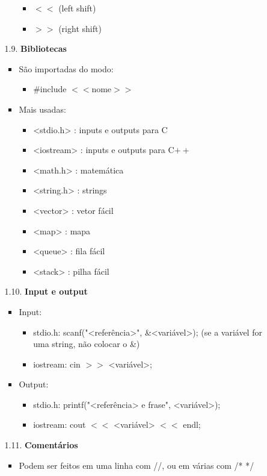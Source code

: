 \documentclass[12pt, a4paper]{article} %
\begin{document}
\begin{enumerate}
\begin{enumerate}
\begin{itemize}
\begin{itemize}
\item $<<$ (left shift)
\item $>>$ (right shift)
\end{itemize}
\end{itemize}
\item[1.9.] \textbf{Bibliotecas}
\begin{itemize}
\item São importadas do modo:
\begin{itemize}
\item \#include $<<$nome$>>$
\end{itemize}
\item Mais usadas:
\begin{itemize}
\item <stdio.h> : inputs e outputs para C
\item <iostream> : inputs e outputs para C$++$
\item <math.h> : matemática
\item <string.h> : strings
\item <vector> : vetor fácil
\item <map> : mapa
\item <queue> : fila fácil
\item <stack> : pilha fácil
\end{itemize}
\end{itemize}
\item[1.10.] \textbf{Input e output}
\begin{itemize}
\item Input:
\begin{itemize}
\item stdio.h: scanf("<referência>", \&<variável>); (se a variável for uma string, não colocar o \&)
\item iostream: cin $>>$ <variável>;
\end{itemize}
\item Output:
\begin{itemize}
\item stdio.h: printf("<referência> e frase", <variável>);
\item iostream: cout $<<$ <variável> $<<$ endl;
\end{itemize}
\end{itemize}
\item[1.11.] \textbf{Comentários}
\begin{itemize}
\item Podem ser feitos em uma linha com //, ou em várias com /* */
\end{itemize}

\end{enumerate}
\end{enumerate}
\end{document}

